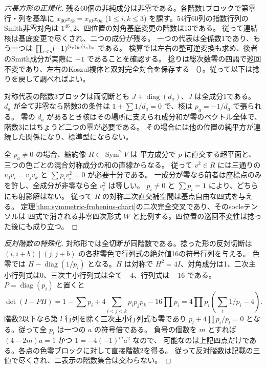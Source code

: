 \begin{proof}[六長方形の正規化]
残る60個の非純成分は非零である。各階数1ブロックで第零行・列を基準に
$x_{00}x_{ik}=x_{i0}x_{0k}$ ($1\le i,k\le3$) を課す。54行60列の指数行列の
Smith非零対角は $1^{46},2$、四位置の対角基底変更の階数は13である。
従って連結核は基底変更で尽くされ、二つの成分が残る。
一つの代表は全係数1であり、もう一つは
$\prod_{r<s}(-1)^{(i_r)_{\rm hi}(i_s)_{\rm lo}}$ である。
検算では左右の整可逆変換も求め、後者のSmith成分が実際に $-1$ であることを確認する。
捻りは総次数零の四語で巡回不変であり、左右のKoszul複体と双対完全対合を保存する
（）。従って以下は捻りを戻して調べればよい。

対称代表の階数3ブロックは両切断とも $J+\operatorname{diag}(d_a)$、$J$ は全成分1である。
$d_a$ が全て非零なら階数3の条件は $1+\sum 1/d_a=0$ で、核は $p_a=-1/d_a$ で張られる。
零の $d_a$ があるとき核はその場所に支えられ成分和が零のベクトル全体で、階数3にはちょうど二つの零が必要である。
その場合には他の位置の純平方が連続した関係になり、標準型にならない。

全 $p_a\ne0$ の場合、縮約像 $R\subset\operatorname{Sym}^2 V$ は
平方成分で $p$ に直交する超平面と、三つの色ごとの混合対称成分の和の直線からなる。
従って $v^2\in R$ には三通りの $v_0v_i=v_jv_k$ と $\sum p_i v_i^2=0$ が必要十分である。
一成分が零なら前者は座標点のみを許し、全成分が非零なら全 $v_i^2$ は等しい。
$p_i\ne0$ と $\sum p_i=1$ により、どちらにも射影解はない。
従って $R$ の対称二次直交補空間は基点自由な四式を与える。
定理\ref{thm:symmetric-frobenius-chart}の二次完全交叉であり、そのsocleテンソルは
四式で消される非零四次形式 $W$ と比例する。四位置の巡回不変性は捻った後にも成り立つ。
\end{proof}

\begin{proof}[反対階数の特殊化]
対称形では全切断が同階数である。捻った形の反対切断は
$(i,i+b)\mid(j,j+b)$ の各非零色で行列式の絶対値16の符号行列を与える。
色零では $H-\operatorname{diag}(1/p_i)$ となる。$H$ は対称で
$H^2=4I$、対角成分は1、二次主小行列式は0、三次主小行列式は全て $-4$、行列式は $-16$ である。
$P=\operatorname{diag}(p_i)$ と置くと
\[
 \det(I-PH)=1-\sum p_i+4\sum_{i<j<k}p_i p_j p_k-16\prod p_i
 =4\prod p_i\left(\sum_i1/p_i-4\right).
\]
階数2以下なら第 $l$ 行列を除く三次主小行列式も零であり
$p_l+4\prod p_i/p_l=0$ となる。従って全 $p_l$ は一つの $a$ の符号倍である。
負号の個数を $m$ とすれば $(4-2m)a=1$ かつ $1=-4(-1)^m a^2$ なので、
可能なのは上記四点だけである。各点の色零ブロックに対して直接階数2を得る。
従って反対階数は記載の三値で尽くされ、二表示の階数集合は交わらない。
\end{proof}
